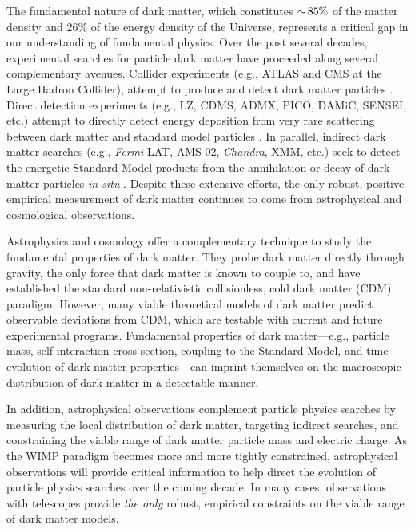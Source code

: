 The fundamental nature of dark matter, which constitutes $ {\sim}\, 85\%$ of the matter density and 26\% of the energy density of the Universe, represents a critical gap in our understanding of fundamental physics.
Over the past several decades, experimental searches for particle dark matter have proceeded along several complementary avenues.
Collider experiments (e.g., ATLAS and CMS at the Large Hadron Collider), attempt to produce and detect dark matter particles \citep{Boveia:2018yeb,Ehret:2010mh,Battaglieri:2017aum}.  
Direct detection experiments (e.g., LZ, CDMS, ADMX, PICO, DAMiC, SENSEI, etc.) attempt to directly detect energy deposition from very rare scattering between dark matter and standard model particles \citep{1509:02910, 1804.10697, Du:2018uak}. 
In parallel, indirect dark matter searches (e.g., {\it Fermi}-LAT, AMS-02, {\it Chandra}, XMM, etc.) seek to detect the energetic Standard Model products from the annihilation or decay of dark matter particles {\it in situ} \citep[\eg][]{1503.02641,1402.2301, 1605.01043, 1603.06978}. 
Despite these extensive efforts, the only robust, positive empirical measurement of dark matter continues to come from astrophysical and cosmological observations. 

Astrophysics and cosmology offer a complementary technique to study the fundamental properties of dark matter. 
They probe dark matter directly through gravity, the only force that dark matter is known to couple to, and have established the standard non-relativistic collisionless, cold dark matter (CDM) paradigm.
However, many viable theoretical models of dark matter predict observable deviations from CDM, which are testable with current and future experimental programs.
Fundamental properties of dark matter---e.g., particle mass, self-interaction cross section, coupling to the Standard Model, and time-evolution of dark matter properties---can imprint themselves on the macroscopic distribution of dark matter in a detectable manner.

In addition, astrophysical observations complement particle physics searches by measuring the local distribution of dark matter, targeting indirect searches, and constraining the viable range of dark matter particle mass and electric charge.
As the WIMP paradigm becomes more and more tightly constrained,  astrophysical observations will provide critical information to help direct the evolution of particle physics searches over the coming decade.  
In many cases, observations with telescopes provide \emph{the only} robust, empirical constraints on the viable range of dark matter models.


